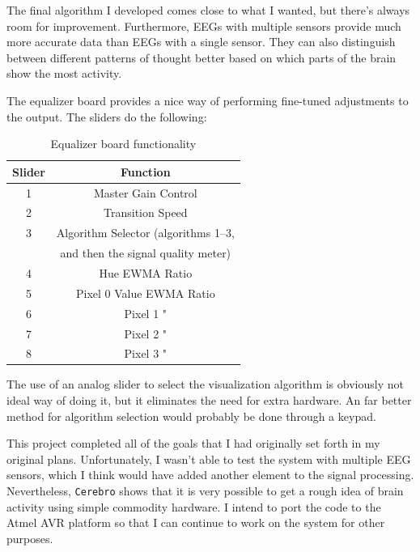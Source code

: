 \documentclass[letterpaper,10pt,notitlepage]{report}
\newcommand{\projname}{\texttt{Cerebro}}
\begin{document}
    The final algorithm I developed comes close to what I wanted, but there's
    always room for improvement.  Furthermore, EEGs with multiple sensors
    provide much more accurate data than EEGs with a single sensor.  They can
    also distinguish between different patterns of thought better based on
    which parts of the brain show the most activity.

    The equalizer board provides a nice way of performing fine-tuned
    adjustments to the output.  The sliders do the following:

    \begin{table}[h!]
        \caption{Equalizer board functionality}
        \begin{center}
            \begin{tabular}{c|c}
                \hline
                \hline
                \textbf{Slider} & \textbf{Function} \\
                \hline
                1 & Master Gain Control \\
                2 & Transition Speed \\
                3 & Algorithm Selector (algorithms 1--3, \\
                  & and then the signal quality meter) \\
                4 & Hue EWMA Ratio \\
                5 & Pixel 0 Value EWMA Ratio \\
                6 & Pixel 1 " \\
                7 & Pixel 2 " \\
                8 & Pixel 3 " \\
                \hline
                \hline
            \end{tabular}
        \end{center}
    \end{table}
                
    The use of an analog slider to select the visualization algorithm is
    obviously not ideal way of doing it, but it eliminates the need for extra
    hardware.  An far better method for algorithm selection would probably be
    done through a keypad.

    This project completed all of the goals that I had originally set forth in
    my original plans.  Unfortunately, I wasn't able to test the system with
    multiple EEG sensors, which I think would have added another element to the
    signal processing.  Nevertheless, \projname{} shows that it is very
    possible to get a rough idea of brain activity using simple commodity
    hardware.  I intend to port the code to the Atmel AVR platform so that I
    can continue to work on the system for other purposes.
\end{document}
